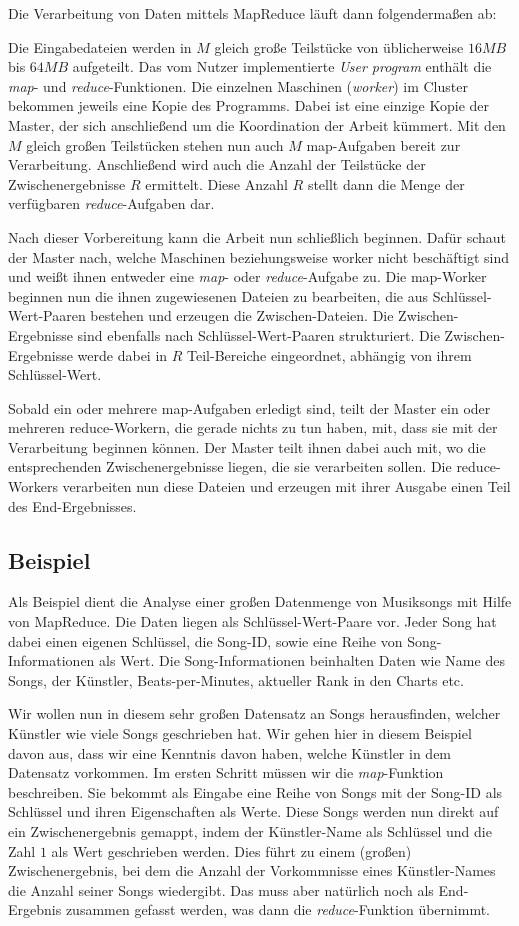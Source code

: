 Die Verarbeitung von Daten mittels MapReduce läuft dann folgendermaßen ab:

Die Eingabedateien werden in $M$ gleich große Teilstücke von üblicherweise $16MB$ bis $64MB$
aufgeteilt. Das vom Nutzer implementierte \textit{User program} enthält die \textit{map}- und 
\textit{reduce}-Funktionen. Die einzelnen Maschinen (\textit{worker}) im Cluster bekommen jeweils
eine Kopie des Programms. Dabei ist eine einzige Kopie der Master, der sich anschließend
um die Koordination der Arbeit kümmert. Mit den $M$ gleich großen Teilstücken stehen nun
auch $M $ map-Aufgaben bereit zur Verarbeitung. Anschließend wird auch die Anzahl der Teilstücke
der Zwischenergebnisse $R$ ermittelt. Diese Anzahl $R$ stellt dann die Menge der verfügbaren
\textit{reduce}-Aufgaben dar.

Nach dieser Vorbereitung kann die Arbeit nun schließlich beginnen. Dafür schaut der Master nach,
welche Maschinen beziehungsweise worker nicht beschäftigt sind und weißt ihnen entweder eine \textit{map}- oder \textit{reduce}-Aufgabe zu. Die map-Worker beginnen nun
die ihnen zugewiesenen Dateien zu bearbeiten, die aus Schlüssel-Wert-Paaren bestehen und
erzeugen die Zwischen-Dateien. Die Zwischen-Ergebnisse sind ebenfalls nach Schlüssel-Wert-Paaren
strukturiert. Die Zwischen-Ergebnisse werde dabei in $R$ Teil-Bereiche eingeordnet, abhängig
von ihrem Schlüssel-Wert.

Sobald ein oder mehrere map-Aufgaben erledigt sind, teilt der Master ein oder mehreren 
reduce-Workern, die gerade nichts zu tun haben, mit, dass sie mit der Verarbeitung beginnen können. Der Master teilt ihnen dabei auch mit, wo die entsprechenden Zwischenergebnisse liegen,
die sie verarbeiten sollen. Die reduce-Workers verarbeiten nun diese Dateien und erzeugen
mit ihrer Ausgabe einen Teil des End-Ergebnisses.


\subsection{Beispiel}
Als Beispiel dient die Analyse einer großen Datenmenge von Musiksongs mit Hilfe von MapReduce. Die Daten liegen als
Schlüssel-Wert-Paare vor. Jeder Song hat dabei einen eigenen Schlüssel, die Song-ID, sowie eine Reihe von Song-Informationen als Wert.
Die Song-Informationen beinhalten Daten wie Name des Songs, der Künstler, Beats-per-Minutes, aktueller Rank in den Charts etc.

Wir wollen nun in diesem sehr großen Datensatz an Songs herausfinden, welcher Künstler wie viele Songs geschrieben hat. Wir gehen
hier in diesem Beispiel davon aus, dass wir eine Kenntnis davon haben, welche Künstler in  dem Datensatz vorkommen.
Im ersten Schritt müssen wir die \textit{map}-Funktion beschreiben. Sie bekommt als Eingabe eine Reihe von Songs mit der Song-ID
als Schlüssel und ihren Eigenschaften als Werte. Diese Songs werden nun direkt auf ein Zwischenergebnis gemappt, indem der
Künstler-Name als Schlüssel und die Zahl $1$ als Wert geschrieben werden. Dies führt zu einem (großen) Zwischenergebnis,
bei dem die Anzahl der Vorkommnisse eines Künstler-Names die Anzahl seiner Songs wiedergibt. Das muss aber
natürlich noch als End-Ergebnis zusammen gefasst werden, was dann die \textit{reduce}-Funktion übernimmt. 

